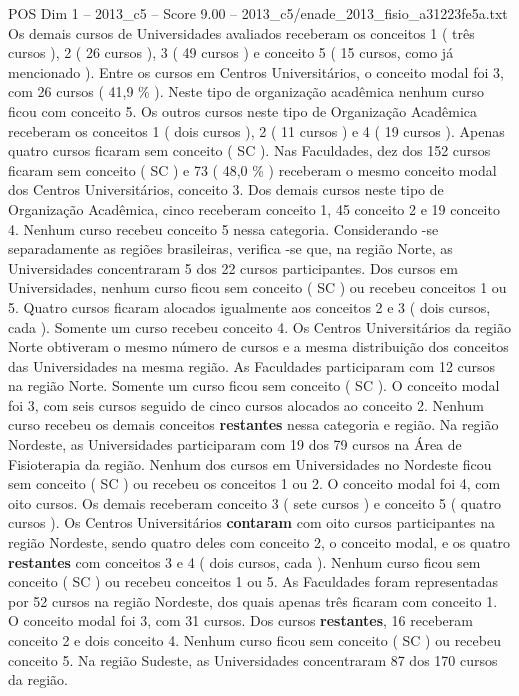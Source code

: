 \begin{textsample}{POS Dim 1 – 2013\_c5 – Score 9.00 – 2013\_c5/enade\_2013\_fisio\_a31223fe5a.txt}
Os demais cursos de Universidades avaliados receberam os conceitos 1 ( três cursos ), 2 ( 26 cursos ), 3 ( 49 cursos ) e conceito 5 ( 15 cursos, como já mencionado ).
Entre os cursos em Centros Universitários, o conceito modal foi 3, com 26 cursos ( 41,9 \% ).
Neste tipo de organização acadêmica nenhum curso ficou com conceito 5.
Os outros cursos neste tipo de Organização Acadêmica receberam os conceitos 1 ( dois cursos ), 2 ( 11 cursos ) e 4 ( 19 cursos ).
Apenas quatro cursos ficaram sem conceito ( SC ).
Nas Faculdades, dez dos 152 cursos ficaram sem conceito ( SC ) e 73 ( 48,0 \% ) receberam o mesmo conceito modal dos Centros Universitários, conceito 3.
Dos demais cursos neste tipo de Organização Acadêmica, cinco receberam conceito 1, 45 conceito 2 e 19 conceito 4.
Nenhum curso recebeu conceito 5 nessa categoria.
Considerando -se separadamente as regiões brasileiras, verifica -se que, na região Norte, as Universidades concentraram 5 dos 22 cursos participantes.
Dos cursos em Universidades, nenhum curso ficou sem conceito ( SC ) ou recebeu conceitos 1 ou 5.
Quatro cursos ficaram alocados igualmente aos conceitos 2 e 3 ( dois cursos, cada ).
Somente um curso recebeu conceito 4.
Os Centros Universitários da região Norte obtiveram o mesmo número de cursos e a mesma distribuição dos conceitos das Universidades na mesma região.
As Faculdades participaram com 12 cursos na região Norte.
Somente um curso ficou sem conceito ( SC ).
O conceito modal foi 3, com seis cursos seguido de cinco cursos alocados ao conceito 2.
Nenhum curso recebeu os demais conceitos \textbf{restantes} nessa categoria e região.
Na região Nordeste, as Universidades participaram com 19 dos 79 cursos na Área de Fisioterapia da região.
Nenhum dos cursos em Universidades no Nordeste ficou sem conceito ( SC ) ou recebeu os conceitos 1 ou 2.
O conceito modal foi 4, com oito cursos.
Os demais receberam conceito 3 ( sete cursos ) e conceito 5 ( quatro cursos ).
Os Centros Universitários \textbf{contaram} com oito cursos participantes na região Nordeste, sendo quatro deles com conceito 2, o conceito modal, e os quatro \textbf{restantes} com conceitos 3 e 4 ( dois cursos, cada ).
Nenhum curso ficou sem conceito ( SC ) ou recebeu conceitos 1 ou 5.
As Faculdades foram representadas por 52 cursos na região Nordeste, dos quais apenas três ficaram com conceito 1.
O conceito modal foi 3, com 31 cursos.
Dos cursos \textbf{restantes}, 16 receberam conceito 2 e dois conceito 4.
Nenhum curso ficou sem conceito ( SC ) ou recebeu conceito 5.
Na região Sudeste, as Universidades concentraram 87 dos 170 cursos da região.

\end{textsample}
